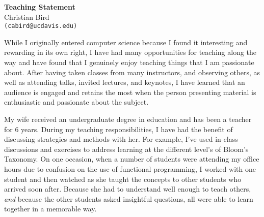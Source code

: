 \documentclass[10pt]{article}
\begin{document}
\lhead{}
\rhead{}
\renewcommand{\headrulewidth}{0pt} 
\renewcommand{\footrulewidth}{0pt} 




\begin{center}
{\LARGE \bf Teaching Statement}\\
\vspace*{0.2cm}
{\large Christian Bird}\\
\vspace*{0.1cm}
\texttt{\normalsize (cabird@ucdavis.edu)}\\
\end{center}



While I originally entered computer science because I found it interesting and
rewarding in its own right, I have had many opportunities for teaching along
the way and have found that I genuinely enjoy teaching things that I am
passionate about.  After having taken classes from many instructors, and
observing others, as well as attending talks, invited lectures, and keynotes, I
have learned that an audience is engaged and retains the most when the
person presenting material is enthusiastic and passionate about the subject.

My wife received an undergraduate degree in education and has been a teacher
for 6 years.  During my teaching responsibilities, I have had the benefit of
discussing strategies and methods with her.  For example, I've used in-class
discussions and exercises to address learning at the different level's of Bloom's
Taxonomy.  On one occasion, when a number of students were attending my office
hours due to confusion on the use of functional programming, I worked with one
student and then watched as she taught the concepts to other students who arrived
soon after.  Because she had to understand well enough to teach others,
\emph{and} because the other students asked insightful questions, all were able
to learn together in a memorable way.
\end{document}
